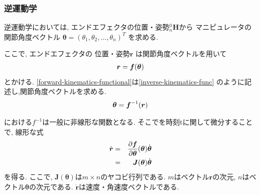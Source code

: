 



\subsubsection{逆運動学}
逆運動学においては, エンドエフェクタの位置・姿勢$^0_n\bm{H}$から
マニピュレータの関節角度ベクトル
$\bm{\theta}=(\theta_1, \theta_2, ..., \theta_n)^T$
を求める.


ここで, %
エンドエフェクタの%
位置・姿勢$\bm{r}$
は関節角度ベクトルを用いて
\begin{eqnarray}
  \bm{r} = \bm{f}(\bm{\theta}) \eqlabel{forward-kinematics-functional}
\end{eqnarray}
とかける.
\eqref{forward-kinematics-functional}は\eqref{inverse-kinematics-func}
のように記述し,関節角度ベクトルを求める.
\begin{eqnarray}
  \bm{\theta} = \bm{f}^{-1}(\bm{r}) \eqlabel{inverse-kinematics-func}
\end{eqnarray}

における$f^{-1}$は一般に非線形な関数となる.
そこでを時刻tに関して微分することで,
線形な式
\begin{eqnarray}
 \dot{\bm{r}} &=& \frac{\partial \bm{f}}{\partial \bm{\theta}}
   (\bm{\theta})\dot{\bm{\theta}} \\
 &=& \bm{J}(\bm{\theta})\dot{\bm{\theta}}
 \eqlabel{inverse-kinematics-base}
\end{eqnarray}
を得る.
ここで, $\bm{J}(\bm{\theta})$は$m \times n$のヤコビ行列である.
$m$はベクトル$\bm{r}$の次元, $n$はベクトル$\bm{\theta}$の次元である.
$\bm{\dot{r}}$は速度・角速度ベクトルである.

